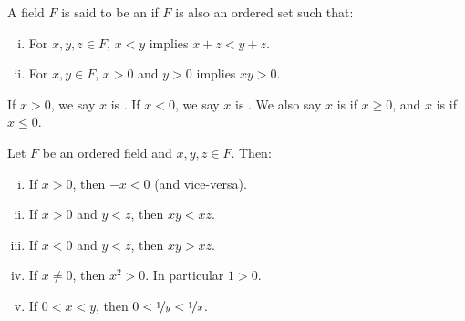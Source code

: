 \documentclass[12pt]{book}
\begin{document}
\begin{defn}
A field $F$ is said to be an \emph{} if
$F$ is also an ordered set such that:
\begin{enumerate}[(i)]
\item \label{defn:ordfield:i} For $x,y,z \in F$,  $x < y$ implies $x+z <
y+z$.
\item \label{defn:ordfield:ii} For $x,y \in F$, $x > 0$ and $y > 0$
implies $xy > 0$.
\end{enumerate}
If $x > 0$, we say $x$ is \emph{}.
If $x < 0$, we say $x$ is \emph{}.
We also say $x$ is \emph{} if $x \geq 0$,
and $x$ is \emph{} if $x \leq 0$.
\end{defn}

\begin{prop} \label{prop:bordfield}
Let $F$ be an ordered field and $x,y,z \in F$.
Then:
\begin{enumerate}[(i)]
\item \label{prop:bordfield:i} If $x > 0$, then $-x < 0$ (and vice-versa).
\item \label{prop:bordfield:ii} If $x > 0$ and $y < z$, then $xy < xz$.
\item \label{prop:bordfield:iii} If $x < 0$ and $y < z$, then $xy > xz$.
\item \label{prop:bordfield:iv} If $x \not= 0$, then $x^2 > 0$. In particular $1>0$.
\item \label{prop:bordfield:v} If $0 < x < y$, then $0 < \nicefrac{1}{y} <
\nicefrac{1}{x}$.
\end{enumerate}
\end{prop}
\end{document}
